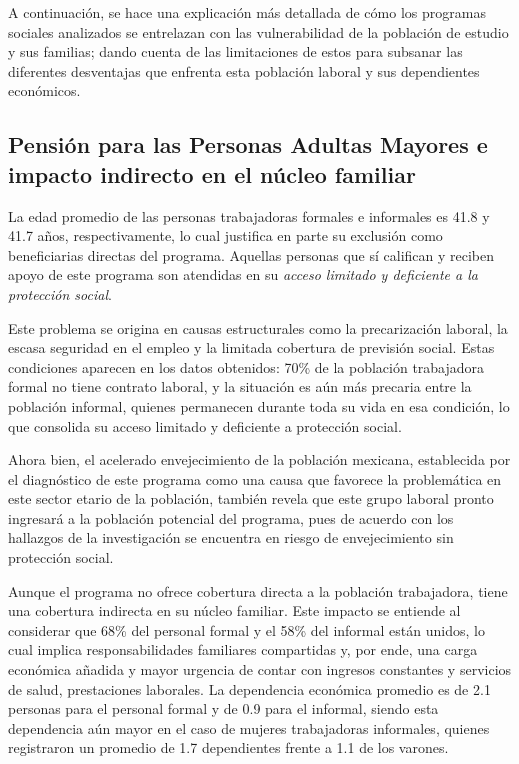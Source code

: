 \documentclass[
  spanish,
  11pt,
  a4paper,
]{scrbook}
\begin{document}
\endgroup

A continuación, se hace una explicación más detallada de cómo los
programas sociales analizados se entrelazan con las vulnerabilidad de la
población de estudio y sus familias; dando cuenta de las limitaciones de
estos para subsanar las diferentes desventajas que enfrenta esta
población laboral y sus dependientes económicos.

\subsection*{Pensión para las Personas Adultas Mayores e impacto
indirecto en el núcleo
familiar}\label{pensiuxf3n-para-las-personas-adultas-mayores-e-impacto-indirecto-en-el-nuxfacleo-familiar}

La edad promedio de las personas trabajadoras formales e informales es
41.8 y 41.7 años, respectivamente, lo cual justifica en parte su
exclusión como beneficiarias directas del programa. Aquellas personas
que sí califican y reciben apoyo de este programa son atendidas en su
\emph{acceso limitado y deficiente a la protección social}.

Este problema se origina en causas estructurales como la precarización
laboral, la escasa seguridad en el empleo y la limitada cobertura de
previsión social. Estas condiciones aparecen en los datos obtenidos:
70\% de la población trabajadora formal no tiene contrato laboral, y la
situación es aún más precaria entre la población informal, quienes
permanecen durante toda su vida en esa condición, lo que consolida su
acceso limitado y deficiente a protección social.

Ahora bien, el acelerado envejecimiento de la población mexicana,
establecida por el diagnóstico de este programa como una causa que
favorece la problemática en este sector etario de la población, también
revela que este grupo laboral pronto ingresará a la población potencial
del programa, pues de acuerdo con los hallazgos de la investigación se
encuentra en riesgo de envejecimiento sin protección social.

Aunque el programa no ofrece cobertura directa a la población
trabajadora, tiene una cobertura indirecta en su núcleo familiar. Este
impacto se entiende al considerar que 68\% del personal formal y el 58\%
del informal están unidos, lo cual implica responsabilidades familiares
compartidas y, por ende, una carga económica añadida y mayor urgencia de
contar con ingresos constantes y servicios de salud, prestaciones
laborales. La dependencia económica promedio es de 2.1 personas para el
personal formal y de 0.9 para el informal, siendo esta dependencia aún
mayor en el caso de mujeres trabajadoras informales, quienes registraron
un promedio de 1.7 dependientes frente a 1.1 de los varones.
\end{document}
